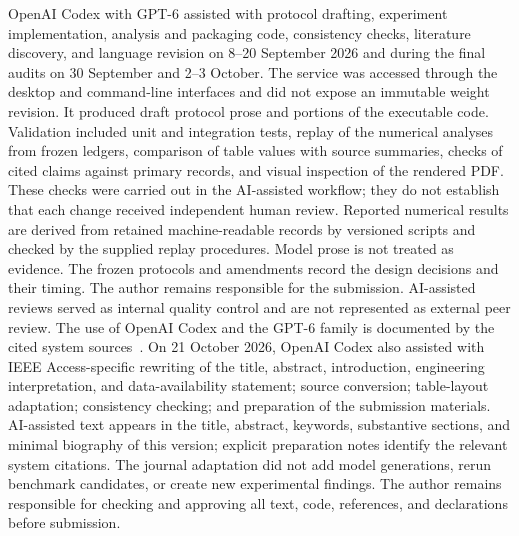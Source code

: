 OpenAI Codex with GPT-6 assisted with protocol drafting, experiment implementation, analysis and packaging code, consistency checks, literature discovery, and language revision on 8--20 September 2026 and during the final audits on 30 September and 2--3 October. The service was accessed through the desktop and command-line interfaces and did not expose an immutable weight revision. It produced draft protocol prose and portions of the executable code. Validation included unit and integration tests, replay of the numerical analyses from frozen ledgers, comparison of table values with source summaries, checks of cited claims against primary records, and visual inspection of the rendered PDF. These checks were carried out in the AI-assisted workflow; they do not establish that each change received independent human review. Reported numerical results are derived from retained machine-readable records by versioned scripts and checked by the supplied replay procedures. Model prose is not treated as evidence. The frozen protocols and amendments record the design decisions and their timing. The author remains responsible for the submission. AI-assisted reviews served as internal quality control and are not represented as external peer review. The use of OpenAI Codex and the GPT-6 family is documented by the cited system sources~\cite{openaicodex2026,openaigpt62026}. On 21 October 2026, OpenAI Codex also assisted with IEEE Access-specific rewriting of the title, abstract, introduction, engineering interpretation, and data-availability statement; source conversion; table-layout adaptation; consistency checking; and preparation of the submission materials. AI-assisted text appears in the title, abstract, keywords, substantive sections, and minimal biography of this version; explicit preparation notes identify the relevant system citations. The journal adaptation did not add model generations, rerun benchmark candidates, or create new experimental findings. The author remains responsible for checking and approving all text, code, references, and declarations before submission.
